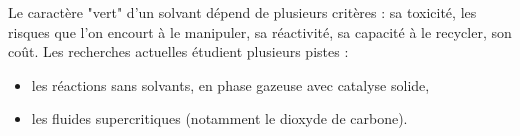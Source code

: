 \documentclass[11pt,a4paper]{report}
\begin{document}
Le caractère "vert" d'un solvant dépend de plusieurs critères : sa toxicité, les risques que l'on encourt à le manipuler, sa réactivité, sa capacité à le recycler, son coût. Les recherches actuelles étudient plusieurs pistes :
\begin{itemize}
	\item les réactions sans solvants, en phase gazeuse avec catalyse solide,
	\item les fluides supercritiques (notamment le dioxyde de carbone).
\end{itemize}
\end{document}
